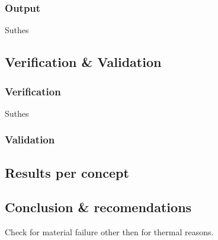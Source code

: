 \subsubsection{Output}
Suthes


\subsection{Verification \& Validation}

\subsubsection{Verification}
Suthes
\subsubsection{Validation}



\subsection{Results per concept}



\subsection{Conclusion \& recomendations}
Check for material failure other then for thermal reasons.